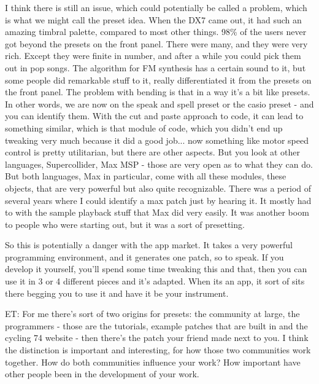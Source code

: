 I think there is still an issue, which could potentially be called a problem, which is what we might call the preset idea. When the DX7 came out, it had such an amazing timbral palette, compared to most other things. 98\% of the users never got beyond the presets on the front panel. There were many, and they were very rich. Except they were finite in number, and after a while you could pick them out in pop songs. The algorithm for FM synthesis has a certain sound to it, but some people did remarkable stuff to it, really differentiated it from the presets on the front panel. The problem with bending is that in a way it's a bit like presets. In other words, we are now on the speak and spell preset or the casio preset - and you can identify them. With the cut and paste approach to code, it can lead to something similar, which is that module of code, which you didn't end up tweaking very much because it did a good job... now something like motor speed control is pretty utilitarian, but there are other aspects. But you look at other languages, Supercollider, Max MSP - those are very open as to what they can do. But both languages, Max in particular, come with all these modules, these objects, that are very powerful but also quite recognizable. There was a period of several years where I could identify a max patch just by hearing it. It mostly had to with the sample playback stuff that Max did very easily. It was another boom to people who were starting out, but it was a sort of presetting. 

So this is potentially a danger with the app market. It takes a very powerful programming environment, and it generates one patch, so to speak. If you develop it yourself, you'll spend some time tweaking this and that, then you can use it in 3 or 4 different pieces and it's adapted. When its an app, it sort of sits there begging you to use it and have it be your instrument. 

ET: For me there's sort of two origins for presets: the community at large, the programmers - those are the tutorials, example patches that are built in and the cycling 74 website - then there's the patch your friend made next to you. I think the distinction is important and interesting, for how those two communities work together. How do both communities influence your work? How important have other people been in the development of your work. 

